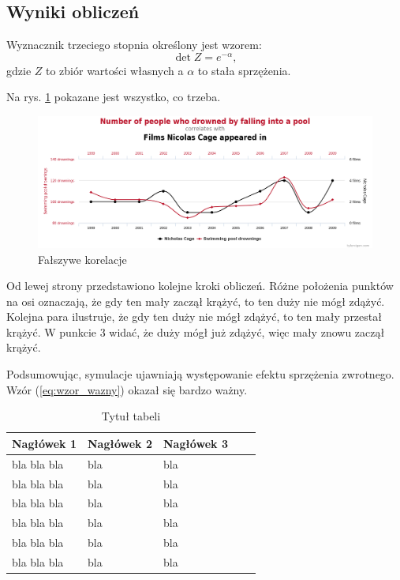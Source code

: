 \documentclass[10pt]{article}
\begin{document}
\subsection{Wyniki obliczeń}
Wyznacznik trzeciego stopnia określony jest wzorem:
\begin{equation}
\det Z = e^{-\alpha},
\label{eq:wzor_wazny}
\end{equation}
gdzie $Z$ to zbiór wartości własnych a $\alpha$ to stała sprzężenia.

Na rys. \ref{fig:korelacje} pokazane jest wszystko, co trzeba.
\begin{figure}[!hbt]
\begin{center}
\includegraphics[width=0.8\linewidth]{rys1.png}
\caption{Fałszywe korelacje}
\label{fig:korelacje}
\end{center}
\end{figure}
Od lewej strony przedstawiono kolejne kroki obliczeń. Różne położenia punktów na osi oznaczają, że gdy ten mały zaczął krążyć, to ten duży nie mógł zdążyć. Kolejna para ilustruje, że gdy ten duży nie mógł zdążyć, to ten mały przestał krążyć. W punkcie 3 widać, że duży mógł już zdążyć, więc mały znowu zaczął krążyć.

Podsumowując, symulacje ujawniają występowanie efektu sprzężenia zwrotnego. Wzór (\ref{eq:wzor_wazny}) okazał się bardzo ważny.

\begin{table}[]
    \begin{tabular}{|l|l|l|l|l|}
    \hline
    Nagłówek 1  & Nagłówek 2  & Nagłówek 3   &  \\ \hline
    bla bla bla & bla & bla &  \\ \hline
    bla bla bla & bla & bla &  \\ \hline
    bla bla bla & bla & bla &  \\ \hline
    bla bla bla & bla & bla &  \\ \hline
    bla bla bla & bla & bla &  \\ \hline
    bla bla bla & bla & bla &  \\ \hline
    \end{tabular}
    \caption{Tytuł tabeli}
\end{table}
\end{document}
